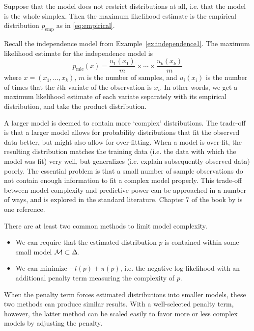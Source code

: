 \documentclass[cclicense]{hmcthesis}
\newcommand*{\mle}{\mathrm{mle}}
\newcommand*{\emp}{\mathrm{emp}}
\numberwithin{equation}{chapter}
\numberwithin{ucounter}{chapter}
\begin{document}
    \begin{example}
        Suppose that the model does not restrict distributions at all, i.e.
        that the model is the whole simplex.  Then the maximum likelihood
        estimate is the empirical distribution $p_\emp$ as in
        \eqref{eq:empirical}.
    \end{example}

    \begin{example}
        Recall the independence model from Example~\ref{ex:independence1}.  The
        maximum likelihood estimate for the independence model is
        \[
            p_\mle(x) = \frac{u_1(x_1)}{m} \times \cdots \times \frac{u_k(x_k)}{m}
        \]
        where $x = (x_1, \ldots, x_k)$, $m$ is the number of samples, and
        $u_i(x_i)$ is the number of times that the $i$th variate of the
        observation is $x_i$.  In other words, we get a maximum likelihood
        estimate of each variate separately with its empirical distribution, and
        take the product distribution.
    \end{example}

    A larger model is deemed to contain more `complex' distributions.  The
    trade-off is that a larger model allows for probability distributions that
    fit the observed data better, but might also allow for over-fitting.  When a
    model is over-fit, the resulting distribution matches the training data
    (i.e. the data with which the model was fit) very well, but generalizes
    (i.e. explain subsequently observed data) poorly.  The essential problem is
    that a small number of sample observations do not contain enough information
    to fit a complex model properly.  This trade-off between model complexity
    and predictive power can be approached in a number of ways, and is explored
    in the standard literature.  Chapter 7 of the book by \citet{EOSL} is one
    reference.  
    
    There are at least two common methods to limit model complexity. 
    \begin{itemize}
    \item We can require that the estimated distribution $p$ is contained within
    some small model $\mathcal{M} \subset \Delta$.
    \item We can minimize $-l(p) + \pi(p)$, i.e. the negative log-likelihood
    with an additional penalty term measuring the complexity of $p$.
    \end{itemize}
    When the penalty term forces estimated distributions into smaller models,
    these two methods can produce similar results.  With a well-selected penalty
    term, however, the latter method can be scaled easily to favor more or less
    complex models by adjusting the penalty.
\end{document}
